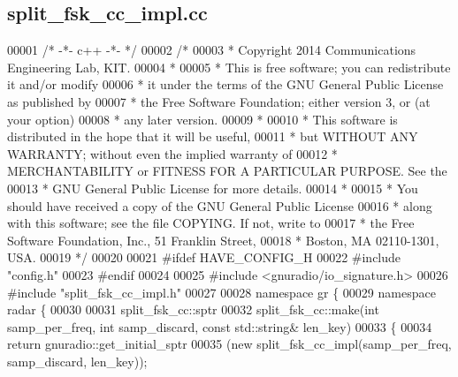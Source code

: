 \subsection{split\+\_\+fsk\+\_\+cc\+\_\+impl.\+cc}
\label{split__fsk__cc__impl_8cc_source}

\begin{DoxyCode}
00001 \textcolor{comment}{/* -*- c++ -*- */}
00002 \textcolor{comment}{/* }
00003 \textcolor{comment}{ * Copyright 2014 Communications Engineering Lab, KIT.}
00004 \textcolor{comment}{ * }
00005 \textcolor{comment}{ * This is free software; you can redistribute it and/or modify}
00006 \textcolor{comment}{ * it under the terms of the GNU General Public License as published by}
00007 \textcolor{comment}{ * the Free Software Foundation; either version 3, or (at your option)}
00008 \textcolor{comment}{ * any later version.}
00009 \textcolor{comment}{ * }
00010 \textcolor{comment}{ * This software is distributed in the hope that it will be useful,}
00011 \textcolor{comment}{ * but WITHOUT ANY WARRANTY; without even the implied warranty of}
00012 \textcolor{comment}{ * MERCHANTABILITY or FITNESS FOR A PARTICULAR PURPOSE.  See the}
00013 \textcolor{comment}{ * GNU General Public License for more details.}
00014 \textcolor{comment}{ * }
00015 \textcolor{comment}{ * You should have received a copy of the GNU General Public License}
00016 \textcolor{comment}{ * along with this software; see the file COPYING.  If not, write to}
00017 \textcolor{comment}{ * the Free Software Foundation, Inc., 51 Franklin Street,}
00018 \textcolor{comment}{ * Boston, MA 02110-1301, USA.}
00019 \textcolor{comment}{ */}
00020  
00021 \textcolor{preprocessor}{#ifdef HAVE\_CONFIG\_H}
00022 \textcolor{preprocessor}{#include "config.h"}
00023 \textcolor{preprocessor}{#endif}
00024 
00025 \textcolor{preprocessor}{#include <gnuradio/io\_signature.h>}
00026 \textcolor{preprocessor}{#include "split_fsk_cc_impl.h"}
00027 
00028 \textcolor{keyword}{namespace }gr \{
00029   \textcolor{keyword}{namespace }radar \{
00030 
00031     split_fsk_cc::sptr
00032     split_fsk_cc::make(\textcolor{keywordtype}{int} samp_per_freq, \textcolor{keywordtype}{int} samp\_discard, \textcolor{keyword}{const} std::string& len\_key)
00033     \{
00034       \textcolor{keywordflow}{return} gnuradio::get\_initial\_sptr
00035         (\textcolor{keyword}{new} split_fsk_cc_impl(samp\_per\_freq, samp\_discard, len\_key));

\end{DoxyCode}
